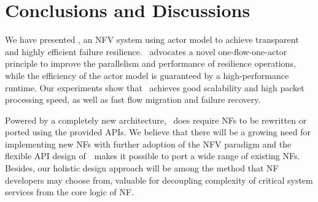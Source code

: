 \section{Conclusions and Discussions}
\label{sec:conclusion}

We have presented \nfactor, an NFV system using actor model to achieve transparent and highly efficient failure resilience. \nfactor~advocates a novel one-flow-one-actor principle to improve the parallelism and performance of resilience operations, while the efficiency of the actor model is guaranteed by a high-performance runtime. Our experiments show that \nfactor~achieves good scalability and high packet processing speed, as well as fast flow migration and failure recovery.

Powered by a completely new architecture, \nfactor~does require NFs to be rewritten or ported using the provided APIs. We believe that there will be a growing need for implementing new NFs with further adoption of the NFV paradigm and the flexible API design of~\nfactor~makes it possible to port a wide range of existing NFs. Besides, our holistic design approach will be among the method that NF developers may choose from, valuable for decoupling complexity of critical system services from the core logic of NF. %


